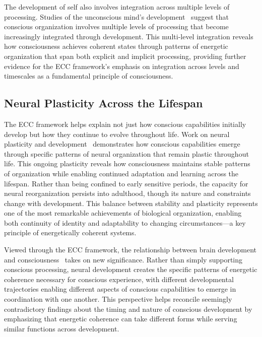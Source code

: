 The development of self also involves integration across multiple levels of processing. Studies of the unconscious mind's development~\cite{Schore2019, pinotsis2023cytoelectric} suggest that conscious organization involves multiple levels of processing that become increasingly integrated through development. This multi-level integration reveals how consciousness achieves coherent states through patterns of energetic organization that span both explicit and implicit processing, providing further evidence for the ECC framework's emphasis on integration across levels and timescales as a fundamental principle of consciousness.

\subsection*{Neural Plasticity Across the Lifespan}

The ECC framework helps explain not just how conscious capabilities initially develop but how they continue to evolve throughout life. Work on neural plasticity and development~\cite{Nelson2021, van2025processes, Quartz2002, da2024mathematical} demonstrates how conscious capabilities emerge through specific patterns of neural organization that remain plastic throughout life. This ongoing plasticity reveals how consciousness maintains stable patterns of organization while enabling continued adaptation and learning across the lifespan. Rather than being confined to early sensitive periods, the capacity for neural reorganization persists into adulthood, though its nature and constraints change with development. This balance between stability and plasticity represents one of the most remarkable achievements of biological organization, enabling both continuity of identity and adaptability to changing circumstances—a key principle of energetically coherent systems.

Viewed through the ECC framework, the relationship between brain development and consciousness~\cite{Johnson2011, amil2024theta} takes on new significance. Rather than simply supporting conscious processing, neural development creates the specific patterns of energetic coherence necessary for conscious experience, with different developmental trajectories enabling different aspects of conscious capabilities to emerge in coordination with one another. This perspective helps reconcile seemingly contradictory findings about the timing and nature of conscious development by emphasizing that energetic coherence can take different forms while serving similar functions across development.

